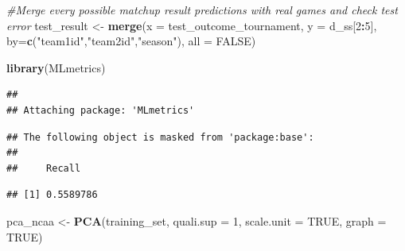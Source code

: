 \documentclass[]{article}
\newenvironment{Shaded}{\begin{snugshade}}{\end{snugshade}}
\newcommand{\KeywordTok}[1]{\textcolor[rgb]{0.13,0.29,0.53}{\textbf{#1}}}
\newcommand{\DataTypeTok}[1]{\textcolor[rgb]{0.13,0.29,0.53}{#1}}
\newcommand{\DecValTok}[1]{\textcolor[rgb]{0.00,0.00,0.81}{#1}}
\newcommand{\StringTok}[1]{\textcolor[rgb]{0.31,0.60,0.02}{#1}}
\newcommand{\CommentTok}[1]{\textcolor[rgb]{0.56,0.35,0.01}{\textit{#1}}}
\newcommand{\OtherTok}[1]{\textcolor[rgb]{0.56,0.35,0.01}{#1}}
\newcommand{\OperatorTok}[1]{\textcolor[rgb]{0.81,0.36,0.00}{\textbf{#1}}}
\newcommand{\NormalTok}[1]{#1}
\begin{document}
\begin{Shaded}
\begin{Highlighting}[]
\CommentTok{#Merge every possible matchup result predictions with real games and check test error}
\NormalTok{test_result <-}\StringTok{ }\KeywordTok{merge}\NormalTok{(}\DataTypeTok{x =}\NormalTok{ test_outcome_tournament, }\DataTypeTok{y =}\NormalTok{ d_ss[}\DecValTok{2}\OperatorTok{:}\DecValTok{5}\NormalTok{], }\DataTypeTok{by=}\KeywordTok{c}\NormalTok{(}\StringTok{"team1id"}\NormalTok{,}\StringTok{"team2id"}\NormalTok{,}\StringTok{"season"}\NormalTok{), }\DataTypeTok{all =} \OtherTok{FALSE}\NormalTok{)}

\KeywordTok{library}\NormalTok{(MLmetrics)}
\end{Highlighting}
\end{Shaded}

\begin{verbatim}
## 
## Attaching package: 'MLmetrics'
\end{verbatim}

\begin{verbatim}
## The following object is masked from 'package:base':
## 
##     Recall
\end{verbatim}

\begin{Shaded}
\end{Shaded}

\begin{verbatim}
## [1] 0.5589786
\end{verbatim}

\begin{Shaded}
\begin{Highlighting}[]
\NormalTok{pca_ncaa <-}\StringTok{ }\KeywordTok{PCA}\NormalTok{(training_set, }\DataTypeTok{quali.sup =} \DecValTok{1}\NormalTok{, }\DataTypeTok{scale.unit =} \OtherTok{TRUE}\NormalTok{,  }\DataTypeTok{graph =} \OtherTok{TRUE}\NormalTok{)}
\end{Highlighting}
\end{Shaded}
\end{document}

